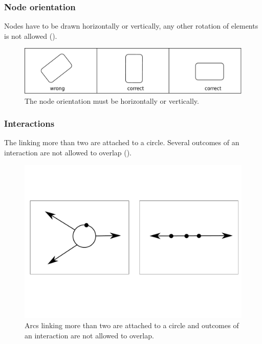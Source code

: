 \subsubsection{Node orientation}

Nodes have to be drawn horizontally or vertically, any other rotation of elements is not allowed ().

\begin{figure}[!htb]
  \centering
  \includegraphics[scale=0.3]{images/layout-orientation}
  \caption{The node orientation must be horizontally or vertically.}\label{fig:layout5}
\end{figure}

\subsubsection{Interactions}

The  linking more than two  are attached to a circle. Several outcomes of an interaction are not allowed to overlap ().

\begin{figure}[!htb]
  \centering
  \includegraphics[scale=0.3]{images/layout-connecting-arcs}
  \caption{Arcs linking more than two  are attached to a circle and outcomes of an interaction are not allowed to overlap.}\label{fig:layout6}
\end{figure}

